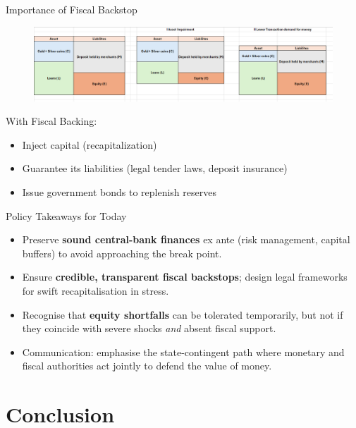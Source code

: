 \documentclass[aspectratio=169, xcolor=table]{beamer}
\begin{document}
\begin{frame}{Importance of Fiscal Backstop}
  \begin{figure}
    \centering
    \includegraphics[width=\textwidth, height=0.75\textheight, keepaspectratio]{pasted-images/Scenario war.png}
    \label{fig:placeholder}
  \end{figure}

  \scriptsize
  With Fiscal Backing:
  \begin{itemize}
    \item Inject capital (recapitalization)
    \item Guarantee its liabilities (legal tender laws, deposit insurance)
    \item Issue government bonds to replenish reserves
  \end{itemize}
\end{frame}



\begin{frame}{Policy Takeaways for Today}
  \begin{itemize}
    \item Preserve \textbf{sound central-bank finances} ex ante (risk management, capital buffers) to avoid approaching the break point.
    \item Ensure \textbf{credible, transparent fiscal backstops}; design legal frameworks for swift recapitalisation in stress.
    \item Recognise that \textbf{equity shortfalls} can be tolerated temporarily, but not if they coincide with severe shocks \emph{and} absent fiscal support.
    \item Communication: emphasise the state-contingent path where monetary and fiscal authorities act jointly to defend the value of money.
  \end{itemize}
\end{frame}


\section{Conclusion}
\end{document}
